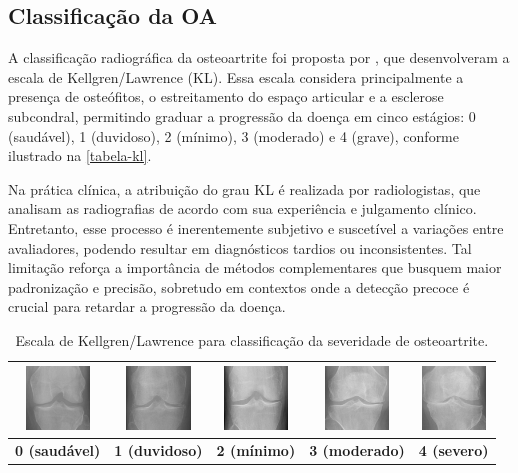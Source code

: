 \subsection{Classificação da OA}

A classificação radiográfica da osteoartrite foi proposta por , que desenvolveram a escala de Kellgren/Lawrence (KL). Essa escala considera principalmente a presença de osteófitos, o estreitamento do espaço articular e a esclerose subcondral, permitindo graduar a progressão da doença em cinco estágios: 0 (saudável), 1 (duvidoso), 2 (mínimo), 3 (moderado) e 4 (grave), conforme ilustrado na \autoref{tabela-kl}.  

Na prática clínica, a atribuição do grau KL é realizada por radiologistas, que analisam as radiografias de acordo com sua experiência e julgamento clínico. Entretanto, esse processo é inerentemente subjetivo e suscetível a variações entre avaliadores, podendo resultar em diagnósticos tardios ou inconsistentes. Tal limitação reforça a importância de métodos complementares que busquem maior padronização e precisão, sobretudo em contextos onde a detecção precoce é crucial para retardar a progressão da doença.

\begin{table}[h]
    \centering
    \caption{Escala de Kellgren/Lawrence para classificação da severidade de osteoartrite.}
    \label{tabela-kl}
    \begin{tabular}{|c|c|c|c|c|}
        \hline
        \includegraphics[width=1.7cm]{figs/KL0-sample.png} & \includegraphics[width=1.7cm]{figs/KL1-sample.png} & \includegraphics[width=1.7cm]{figs/KL2-sample.png} & \includegraphics[width=1.7cm]{figs/KL3-sample.png} & \includegraphics[width=1.7cm]{figs/KL4-sample.png} \\
        \hline
        \textbf{0 (saudável)} & \textbf{1 (duvidoso)} & \textbf{2 (mínimo)} & \textbf{3 (moderado)} & \textbf{4 (severo)} \\
        \hline
    \end{tabular}
\end{table}

